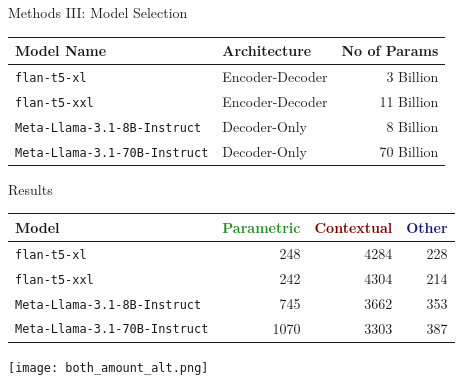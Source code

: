\documentclass[10pt]{beamer}
\newcommand{\Parametric}{\textbf{\textcolor{ForestGreen}{Parametric}}}
\newcommand{\Contextual}{\textbf{\textcolor{Maroon}{Contextual}}}
\newcommand{\Other}{\textbf{\textcolor{MidnightBlue}{Other}}}
\newcommand{\smallflan}{\texttt{flan-t5-xl}}
\newcommand{\bigflan}{\texttt{flan-t5-xxl}}
\newcommand{\smallllama}{\texttt{Meta-Llama-3.1-8B-Instruct}}
\newcommand{\bigllama}{\texttt{Meta-Llama-3.1-70B-Instruct}}
\begin{document}
\begin{frame}{Methods \textrm{III}: Model Selection}
	\centering
	\small
	\begin{tabular}{l l r}
		\toprule
			\bfseries Model Name & \bfseries Architecture & \bfseries No of Params \\
		\midrule
			\smallflan{} & Encoder-Decoder & 3 Billion \\
			\bigflan{} & Encoder-Decoder & 11 Billion \\
		\midrule
			\smallllama{} & Decoder-Only & 8 Billion \\
			\bigllama{} & Decoder-Only & 70 Billion \\
		\bottomrule
	\end{tabular}
\end{frame}

% 
% 
% 

\begin{frame}{Results}
	\centering
	\small
	\begin{tabular}{l r r r}
		\toprule
			\bfseries Model & \Parametric{} & \Contextual{} & \Other{} \\
		\midrule
			\smallflan{}  & 248 & 4284 & 228 \\
			\bigflan{} & 242 & 4304 & 214 \\
		\midrule
			\smallllama{} & 745 & 3662 & 353 \\
			\bigllama{} & 1070 & 3303 & 387 \\
		\bottomrule
	\end{tabular}

	\vfill{}

	\texttt{[image: both\_amount\_alt.png]}
\end{frame}
\end{document}
